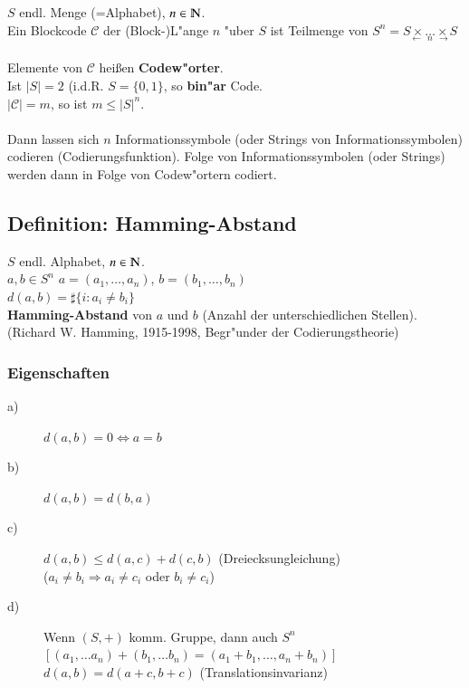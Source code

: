 $S$ endl. Menge (=Alphabet), $n \in \N$. \\
Ein Blockcode $\mathcal{C}$
der (Block-)L"ange $n$ "uber $S$ ist Teilmenge von $S^n=\underset{\longleftarrow \ \  n\ \  \longrightarrow}{S \times \ldots \times S}$ \\ %
\\
Elemente von $\mathcal{C}$ hei\ss en \textbf{Codew"orter}. \\
Ist $\left| S \right| = 2$ (i.d.R. $S=\lbrace 0,1 \rbrace$, so \textbf{bin"ar} Code.\\
$\left| \mathcal{C} \right| = m$, so ist $m \leq \left| S \right| ^ n$. \\
\\
Dann lassen sich $n$ Informationssymbole (oder Strings von Informationssymbolen) codieren (Codierungsfunktion). Folge von Informationssymbolen (oder Strings) werden dann in Folge von Codew"ortern codiert.

\subsection{Definition: Hamming-Abstand}
$S$ endl. Alphabet, $n \in \N$. \\
$a,b \in S^n$ $a=(a_1, \ldots, a_n)$, $b=(b_1, \ldots, b_n)$ \\
$d(a, b)= \sharp \lbrace i : a_i \neq b_i \rbrace$ \\
\textbf{Hamming-Abstand} von $a$ und $b$ (Anzahl der unterschiedlichen Stellen). \\
(Richard W. Hamming, 1915-1998, Begr"under der Codierungstheorie)

\subsubsection{Eigenschaften}
\begin{description}
	\item[a)] $d(a,b)=0 \Leftrightarrow a=b$
	\item[b)] $d(a,b)=d(b,a)$
	\item[c)] $d(a,b) \leq d(a,c) + d(c,b)$ (Dreiecksungleichung) \\
			($a_i \neq b_i \Rightarrow a_i \neq c_i$ oder $b_i \neq c_i$) 
	\item[d)] 	Wenn $(S,+)$ komm. Gruppe, dann auch $S^n$\\
				$[ (a_1,\ldots a_n) + (b_1, \ldots b_n) = (a_1+b_1,\ldots, a_n+b_n)]$\\
				$d(a,b)=d(a+c,b+c)$ (Translationsinvarianz)				
\end{description}


